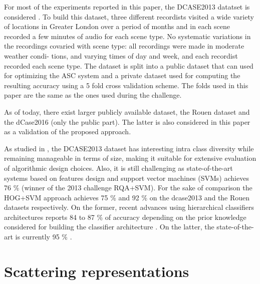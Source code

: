 \documentclass[journal]{IEEEtran}
\newcommand{\gl}[1]{\textcolor{red}{Gr\'egoire : #1}}
\begin{document}


For most of the experiments reported in this paper, the DCASE2013 datatset is considered \cite{giannoulis2013database, 7100934}. To build this dataset, three different recordists visited a wide variety of locations in Greater London over
a period of months and in each
scene recorded a few minutes of audio for each scene type. No
systematic variations in the recordings covaried with scene
type: all recordings were made in moderate weather condi-
tions, and varying times of day and week, and each recordist
recorded each scene type. The dataset is split into a public dataset that can used for optimizing the ASC system and a private dataset used for computing the resulting accuracy using a 5 fold cross validation scheme. The folds used in this paper are the same as the ones used during the challenge.

As of today, there exist larger publicly available dataset, the
Rouen dataset \cite{rakotomamonjy2015histogram} and the dCase2016 \cite{Mesaros2016_EUSIPCO} (only the public part). The latter is also considered in this paper as a validation of the proposed approach.

As studied in \cite{lagrange:hal-01082501}, the DCASE2013 dataset has interesting intra class diversity while remaining manageable in terms of size, making it suitable for extensive evaluation of algorithmic design choices. Also, it is still challenging as state-of-the-art systems based on features design and support vector machines (SVMs) achieves 76 \% \cite{roma2013} (winner of the 2013 challenge RQA+SVM). For the sake of comparison the HOG+SVM approach \cite{rakotomamonjy2015histogram} achieves 75 \% and 92 \% on the dcase2013 and the Rouen datasets respectively. On the former, recent advances using hierarchical classifiers architectures reports 84 to 87 \% of accuracy depending on the prior knowledge considered for building the classifier architecture \cite{phan2016label}. On the latter, the state-of-the-art is currently 95 \% \cite{bisot2016acoustic}. 

\section{Scattering representations \label{sec:scattering}}
\end{document}
